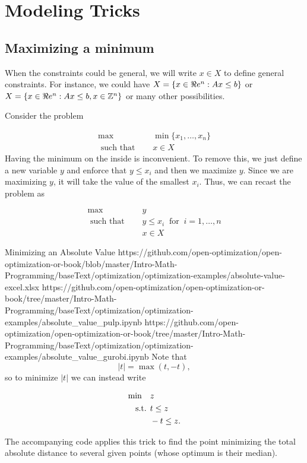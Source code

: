 \section{Modeling Tricks}

\subsection{Maximizing a minimum}
When the constraints could be general, we will write $x \in X$ to define general constraints.  For instance, we could have $X = \{ x \in \Re e^n : Ax \leq b\}$ or $X  = \{ x \in \Re e^n : Ax \leq b, x \in \mathbb{Z}^n\}$ or many other possibilities.  

Consider the problem 

\begin{align*}
\max   \quad & \min \{x_1, \dots, x_n\}\\
\text{ such that } \quad &  x \in X
\end{align*}
Having the minimum on the inside is inconvenient.  To remove this, we just define a new variable $y$ and enforce that $y \leq x_i$ and then we maximize $y$.  Since we are maximizing $y$, it will take the value of the smallest $x_i$.  Thus, we can recast the problem as

\begin{align*}
\max\quad    & y\\
\text{ such that } \quad  & y \leq x_i \ \text{ for }\  i=1, \dots, n \\
&  x \in X
\end{align*}

\begin{examplewithallcode}{Minimizing an Absolute Value}
{https://github.com/open-optimization/open-optimization-or-book/blob/master/Intro-Math-Programming/baseText/optimization/optimization-examples/absolute-value-excel.xlsx}
{https://github.com/open-optimization/open-optimization-or-book/tree/master/Intro-Math-Programming/baseText/optimization/optimization-examples/absolute_value_pulp.ipynb}
{https://github.com/open-optimization/open-optimization-or-book/tree/master/Intro-Math-Programming/baseText/optimization/optimization-examples/absolute_value_gurobi.ipynb}
Note that
$$
|t| = \max(t, -t),
$$
so to minimize $|t|$ we can instead write

\begin{align*}
\min \quad & z\\
\mbox{ s.t. }        & t \leq z\\
           & -t \leq z.
\end{align*}

The accompanying code applies this trick to find the point minimizing the total
absolute distance to several given points (whose optimum is their median).
\end{examplewithallcode}

